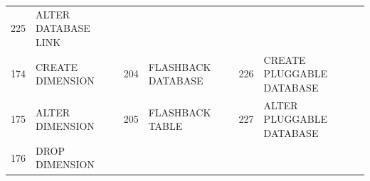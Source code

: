 \begin{appendix}
\begin{longtable}[]{@{}rl|rl|rl@{}}
\begin{minipage}[t]{0.06\columnwidth}
225\strut
\end{minipage} & \begin{minipage}[t]{0.24\columnwidth}\raggedright\strut
ALTER DATABASE LINK\strut
\end{minipage}\tabularnewline
\begin{minipage}[t]{0.06\columnwidth}\raggedright\strut
174\strut
\end{minipage} & \begin{minipage}[t]{0.19\columnwidth}\raggedright\strut
CREATE DIMENSION\strut
\end{minipage} & \begin{minipage}[t]{0.06\columnwidth}\raggedright\strut
204\strut
\end{minipage} & \begin{minipage}[t]{0.24\columnwidth}\raggedright\strut
FLASHBACK DATABASE\strut
\end{minipage} & \begin{minipage}[t]{0.06\columnwidth}\raggedright\strut
226\strut
\end{minipage} & \begin{minipage}[t]{0.24\columnwidth}\raggedright\strut
CREATE PLUGGABLE DATABASE\strut
\end{minipage}\tabularnewline
\begin{minipage}[t]{0.06\columnwidth}\raggedright\strut
175\strut
\end{minipage} & \begin{minipage}[t]{0.19\columnwidth}\raggedright\strut
ALTER DIMENSION\strut
\end{minipage} & \begin{minipage}[t]{0.06\columnwidth}\raggedright\strut
205\strut
\end{minipage} & \begin{minipage}[t]{0.24\columnwidth}\raggedright\strut
FLASHBACK TABLE\strut
\end{minipage} & \begin{minipage}[t]{0.06\columnwidth}\raggedright\strut
227\strut
\end{minipage} & \begin{minipage}[t]{0.24\columnwidth}\raggedright\strut
ALTER PLUGGABLE DATABASE\strut
\end{minipage}\tabularnewline
\begin{minipage}[t]{0.06\columnwidth}\raggedright\strut
176\strut
\end{minipage} & \begin{minipage}[t]{0.19\columnwidth}\raggedright\strut
DROP DIMENSION\strut

\end{minipage}
\end{longtable}
\end{appendix}
